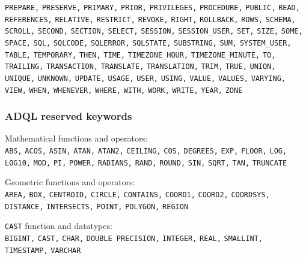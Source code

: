 \documentclass[11pt,a4paper]{ivoa}
\begin{document}
\texttt{PREPARE,} \texttt{PRESERVE,} 
\texttt{PRIMARY,} \texttt{PRIOR,} \texttt{PRIVILEGES,} 
\texttt{PROCEDURE,} \texttt{PUBLIC,} \texttt{READ,} 
\texttt{REFERENCES,} \texttt{RELATIVE,} \texttt{RESTRICT,} 
\texttt{REVOKE,} \texttt{RIGHT,} \texttt{ROLLBACK,} \texttt{ROWS,} 
\texttt{SCHEMA,} \texttt{SCROLL,} \texttt{SECOND,} \texttt{SECTION,} 
\texttt{SELECT,} \texttt{SESSION,} \texttt{SESSION\_USER,} 
\texttt{SET,} \texttt{SIZE,} \texttt{SOME,} 
\texttt{SPACE,} \texttt{SQL,} \texttt{SQLCODE,} \texttt{SQLERROR,} 
\texttt{SQLSTATE,} \texttt{SUBSTRING,} \texttt{SUM,} 
\texttt{SYSTEM\_USER,} \texttt{TABLE,} \texttt{TEMPORARY,} 
\texttt{THEN,} \texttt{TIME,} 
\texttt{TIMEZONE\_HOUR,} \texttt{TIMEZONE\_MINUTE,} \texttt{TO,} 
\texttt{TRAILING,} \texttt{TRANSACTION,} \texttt{TRANSLATE,} 
\texttt{TRANSLATION,} \texttt{TRIM,} \texttt{TRUE,} \texttt{UNION,} 
\texttt{UNIQUE,} \texttt{UNKNOWN,} \texttt{UPDATE,} 
\texttt{USAGE,} \texttt{USER,} \texttt{USING,} \texttt{VALUE,} 
\texttt{VALUES,} \texttt{VARYING,} \texttt{VIEW,} 
\texttt{WHEN,} \texttt{WHENEVER,} \texttt{WHERE,} \texttt{WITH,} 
\texttt{WORK,} \texttt{WRITE,} \texttt{YEAR,} \texttt{ZONE} 

\subsubsection{ADQL reserved keywords}
\label{sec:adql.reswords}

\noindent
Mathematical functions and operators:\\
\noindent
\texttt{ABS,} \texttt{ACOS,} \texttt{ASIN,} \texttt{ATAN,} 
\texttt{ATAN2,} \texttt{CEILING,} \texttt{COS,} \texttt{DEGREES,} 
\texttt{EXP,} \texttt{FLOOR,} \texttt{LOG,} \texttt{LOG10,} 
\texttt{MOD,} \texttt{PI,} \texttt{POWER,} \texttt{RADIANS,} 
\texttt{RAND,} \texttt{ROUND,} \texttt{SIN,} \texttt{SQRT,} 
\texttt{TAN,} \texttt{TRUNCATE}
\newline

\noindent
Geometric functions and operators:\\
\noindent
\texttt{AREA,} \texttt{BOX,} \texttt{CENTROID,} \texttt{CIRCLE,} 
\texttt{CONTAINS,} \texttt{COORD1,} \texttt{COORD2,} 
\texttt{COORDSYS,} \texttt{DISTANCE,} \texttt{INTERSECTS,} 
\texttt{POINT,} \texttt{POLYGON,} \texttt{REGION}
\newline

\noindent
\verb:CAST: function and datatypes:\\
\noindent
\texttt{BIGINT,} \texttt{CAST,} \texttt{CHAR,} \texttt{DOUBLE PRECISION,} 
\texttt{INTEGER,} \texttt{REAL,} \texttt{SMALLINT,} \texttt{TIMESTAMP,}
\texttt{VARCHAR} 
\newline
\end{document}
